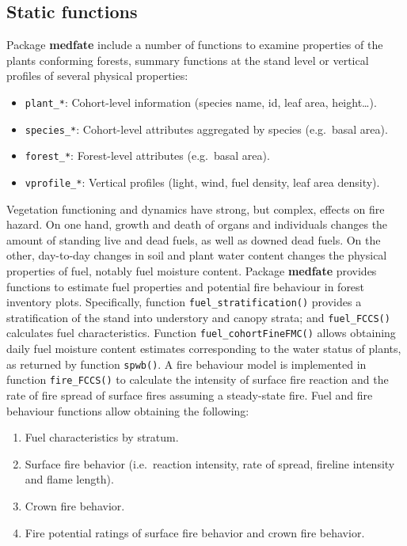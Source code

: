 \documentclass[]{book}
\providecommand{\tightlist}{%
  \setlength{\itemsep}{0pt}\setlength{\parskip}{0pt}}
\begin{document}
\subsection{Static functions}\label{static-functions}

Package \textbf{medfate} include a number of functions to examine
properties of the plants conforming forests, summary functions at the
stand level or vertical profiles of several physical properties:

\begin{itemize}
\tightlist
\item
  \texttt{plant\_*}: Cohort-level information (species name, id, leaf
  area, height\ldots{}).
\item
  \texttt{species\_*}: Cohort-level attributes aggregated by species
  (e.g.~basal area).
\item
  \texttt{forest\_*}: Forest-level attributes (e.g.~basal area).
\item
  \texttt{vprofile\_*}: Vertical profiles (light, wind, fuel density,
  leaf area density).
\end{itemize}

Vegetation functioning and dynamics have strong, but complex, effects on
fire hazard. On one hand, growth and death of organs and individuals
changes the amount of standing live and dead fuels, as well as downed
dead fuels. On the other, day-to-day changes in soil and plant water
content changes the physical properties of fuel, notably fuel moisture
content. Package \textbf{medfate} provides functions to estimate fuel
properties and potential fire behaviour in forest inventory plots.
Specifically, function \texttt{fuel\_stratification()} provides a
stratification of the stand into understory and canopy strata; and
\texttt{fuel\_FCCS()} calculates fuel characteristics. Function
\texttt{fuel\_cohortFineFMC()} allows obtaining daily fuel moisture
content estimates corresponding to the water status of plants, as
returned by function \texttt{spwb()}. A fire behaviour model is
implemented in function \texttt{fire\_FCCS()} to calculate the intensity
of surface fire reaction and the rate of fire spread of surface fires
assuming a steady-state fire. Fuel and fire behaviour functions allow
obtaining the following:

\begin{enumerate}
\def\labelenumi{\arabic{enumi}.}
\tightlist
\item
  Fuel characteristics by stratum.
\item
  Surface fire behavior (i.e.~reaction intensity, rate of spread,
  fireline intensity and flame length).
\item
  Crown fire behavior.
\item
  Fire potential ratings of surface fire behavior and crown fire
  behavior.
\end{enumerate}
\end{document}
